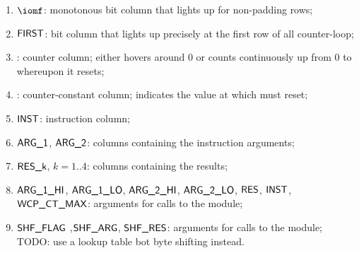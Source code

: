 \begin{enumerate}
    \item $\iomf$:
	monotonous bit column that lights up for non-padding rows;
    \item $\textsf{FIRST}$:
	bit column that lights up precisely at the first row of all counter-loop;
    \item \ct{}:
	counter column; 
	either hovers around $0$ or counts continuously up from $0$ to \maxCt{} whereupon it resets;
    \item \maxCt:
	counter-constant column;
	indicates the value at which \ct{} must reset;
    \item
	\godGiven{}
	$\textsf{INST}{}$:
	instruction column;
    \item
	\godGiven{}
	$\textsf{ARG}\textsf{\_1}$, $\textsf{ARG}\textsf{\_2}$:
	columns containing the instruction arguments;
    \item
	\markAsJustifiedHere{}
	$\textsf{RES\_k}$, $k=1..4$:
	columns containing the results;
    \item $\textsf{ARG}\textsf{\_1}\textsf{\_HI}$, $\textsf{ARG}\textsf{\_1}\textsf{\_LO}$, $\textsf{ARG}\textsf{\_2}\textsf{\_HI}$, $\textsf{ARG}\textsf{\_2}\textsf{\_LO}$, $\textsf{RES}$, $\textsf{INST}$, $\textsf{WCP\_CT\_MAX}$:
	arguments for calls to the \wcpMod{} module;
    \item $\textsf{SHF\_FLAG}$ ,$\textsf{SHF\_ARG}$, $\textsf{SHF\_RES}$:
	arguments for calls to the \shfMod{} module; TODO: use a lookup table bot byte shifting instead.
\end{enumerate}
